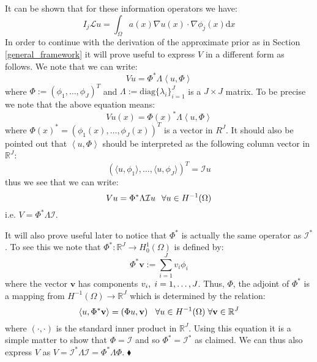 It can be shown that for these information operators we have:
\begin{equation}
    \label{info_operator_with_pde_op}
    I_{j}\mathcal{L}u=\int_{\Omega}a(x)\nabla u(x)\cdot\nabla \phi_{j}(x)\mathrm{d}x
\end{equation}
In order to continue with the derivation of the approximate prior as in Section \textcolor{blue}{\ref{general_framework}} it will prove useful to express $V$ in a different form as follows. We note that we can write:
\begin{equation}
    Vu = \Phi^{*}\Lambda\left\langle u, \Phi\right\rangle
\end{equation}
where $\Phi:=(\phi_{1},\dots,\phi_{J})^{T}$ and $\Lambda:=\text{diag}\{\lambda_{i}\}_{i=1}^{J}$ is a $J\times J$ matrix. To be precise we note that the above equation means:
\begin{equation}
    Vu(x) = \Phi(x)^{*}\Lambda\left\langle u,\Phi\right\rangle
\end{equation}
where $\Phi(x)^{*}=(\phi_{1}(x),\dots,\phi_{J}(x))^{T}$ is a vector in $R^{J}$. It should also be pointed out that $\left\langle u,\Phi\right\rangle$ should be interpreted as the following column vector in $\mathbb{R}^{J}$:
\begin{equation}
    (\langle u,\phi_{1}\rangle,\dots,\langle u,\phi_{J}\rangle)^{T}=\mathcal{I}u
\end{equation}
thus we see that we can write:
\begin{equation}
    Vu=\Phi^{*}\Lambda\mathcal{I}u \hspace{0.25cm} \forall u\in H^{-1}(\Omega)
\end{equation}
i.e. $V=\Phi^{*}\Lambda\mathcal{I}$. \vspace{10pt}

\begin{remark}
    It will also prove useful later to notice that $\Phi^{*}$ is actually the same operator as $\mathcal{I}^{*}$. To see this we note that $\Phi^{*}:\mathbb{R}^{J}\rightarrow H_{0}^{1}(\Omega)$ is defined by:
    \begin{equation}
        \label{projection_into_fem_space}
        \Phi^{*}\mathbf{v}:=\sum_{i=1}^{J}v_{i}\phi_{i}
    \end{equation}
    where the vector $\mathbf{v}$ has components $v_{i}, \hspace{0.1cm} i=1,\dots,J$. Thus, $\Phi$, the adjoint of $\Phi^{*}$ is a mapping from $H^{-1}(\Omega)\rightarrow\mathbb{R}^{J}$ which is determined by the relation:
    \begin{equation}
        \langle u,\Phi^{*}\mathbf{v}\rangle = \left(\Phi u,\mathbf{v}\right) \hspace{0.25cm} \forall u\in H^{-1}(\Omega) \hspace{0.1cm} \forall \mathbf{v}\in\mathbb{R}^{J}
    \end{equation}
    where $(\boldsymbol{\cdot},\boldsymbol{\cdot})$ is the standard inner product in $\mathbb{R}^{J}$. Using this equation it is a simple matter to show that $\Phi=\mathcal{I}$ and so $\Phi^{*}=\mathcal{I}^{*}$ as claimed. We can thus also express $V$ as $V=\mathcal{I}^{*}\Lambda\mathcal{I}=\Phi^{*}\Lambda\Phi$.
    $\mathbin{\blacklozenge}$
\end{remark}

